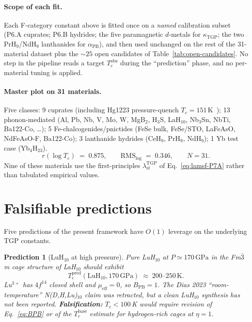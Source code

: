 \documentclass[11pt,a4paper]{article}
\newcommand{\lamsf}{\lambda_{\mathrm{sf}}}
\newcommand{\BPB}{B_{\mathrm{PB}}}
\newcommand{\GPa}{\,\mathrm{GPa}}
\newtheorem{prediction}[theorem]{Prediction}
\begin{document}
\paragraph{Scope of each fit.} Each \textsf{F}-category constant above is
fitted once on a \emph{named} calibration subset (P6.A cuprates; P6.B
hydrides; the five paramagnetic $d$-metals for $\kappa_{\mathrm{TGP}}$;
the two PrH$_{9}$/NdH$_{9}$ lanthanides for $\alpha_{\mathrm{PB}}$),
and then used unchanged on the rest of the 31-material dataset plus
the $\sim\!25$ open candidates of
Table~\ref{tab:open-candidates}. No step in the pipeline reads a target
$T_{c}^{\mathrm{obs}}$ during the ``prediction'' phase, and no per-material
tuning is applied.

\paragraph{Master plot on 31 materials.}
Five classes: 9 cuprates (including Hg1223 pressure-quench
$T_{c}=151$\,K~\cite{Deng2026}); 13 phonon-mediated (Al, Pb, Nb, V, Mo,
W, MgB$_{2}$, H$_{3}$S, LaH$_{10}$, Nb$_{3}$Sn, NbTi, Ba122-Co, \ldots);
5 Fe-chalcogenides/pnictides (FeSe bulk, FeSe/STO, LaFeAsO,
NdFeAsO-F, Ba122-Co); 3 lanthanide hydrides (CeH$_{9}$, PrH$_{9}$,
NdH$_{9}$); 1 Yb test case (Yb$_{4}$H$_{23}$).
\begin{equation}\label{eq:master-corr}
  r(\log T_{c}) \;=\; 0.875,
  \qquad
  \mathrm{RMS}_{\log} \;=\; 0.346,
  \qquad
  N = 31.
\end{equation}
Nine of these materials use the first-principles
$\lamsf^{\mathrm{TGP}}$ of Eq.~\eqref{eq:lamsf-P7A} rather than
tabulated empirical values.

\section{Falsifiable predictions}\label{sec:predictions}

Five predictions of the present framework have $O(1)$ leverage on the
underlying TGP constants.

\begin{prediction}[LuH$_{10}$ at high pressure]\label{pred:LuH10}
Pure LuH$_{10}$ at $P\!\simeq\!170\GPa$ in the Fm$\bar{3}$m cage
structure of LaH$_{10}$ should exhibit
\begin{equation}\label{eq:LuH10}
  T_{c}^{\mathrm{pred}}(\mathrm{LuH}_{10},170\GPa)
  \;\approx\;200\text{--}250\,\text{K}.
\end{equation}
Lu$^{3+}$ has $4f^{14}$ closed shell and $\mu_{\mathrm{eff}}=0$, so
$\BPB=1$. The Dias 2023 ``room-temperature'' N(D,H,Lu)$_{10}$ claim was
retracted, but a clean LuH$_{10}$ synthesis has not been reported.
\textbf{Falsification:} $T_{c}<100$\,K would require revision of
Eq.~\eqref{eq:BPB} or of the $T_{c}^{\mathrm{base}}$ estimate for
hydrogen-rich cages at $\eta=1$.
\end{prediction}
\end{document}
